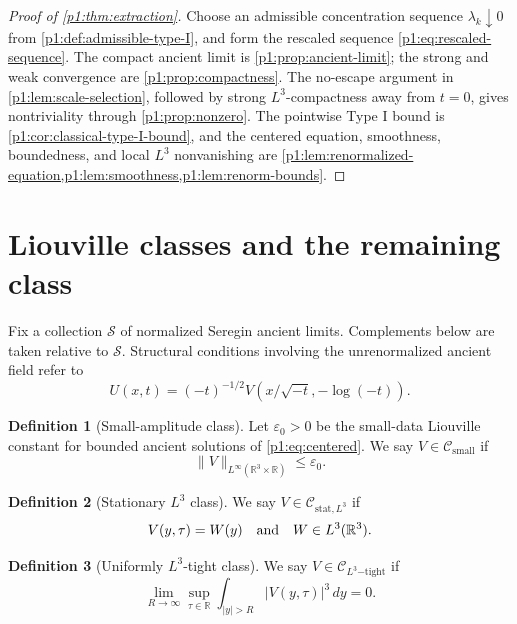 \documentclass[11pt]{amsart}
\theoremstyle{plain}
\theoremstyle{definition}
\newtheorem{definition}[definition]{Definition}
\theoremstyle{remark}
\numberwithin{equation}{section}
\newcommand{\R}{\mathbb R}
\newcommand{\calS}{\mathcal S}
\newcommand{\calC}{\mathcal C}
\begin{document}
\begin{proof}[Proof of \cref{p1:thm:extraction}]
Choose an admissible concentration sequence
\(\lambda_k\downarrow0\) from \cref{p1:def:admissible-type-I}, and form the
rescaled sequence \eqref{p1:eq:rescaled-sequence}.  The compact ancient limit is
\cref{p1:prop:ancient-limit}; the strong and weak convergence are
\cref{p1:prop:compactness}.  The no-escape argument in
\cref{p1:lem:scale-selection}, followed by strong \(L^3\)-compactness away from
\(t=0\), gives nontriviality through \cref{p1:prop:nonzero}.  The pointwise
Type I bound is \cref{p1:cor:classical-type-I-bound}, and the centered equation,
smoothness, boundedness, and local \(L^3\) nonvanishing are
\cref{p1:lem:renormalized-equation,p1:lem:smoothness,p1:lem:renorm-bounds}.
\end{proof}

\section{Liouville classes and the remaining class}\label{p1:sec:classes}

Fix a collection \(\calS\) of normalized Seregin ancient limits.  Complements
below are taken relative to \(\calS\).  Structural conditions involving the
unrenormalized ancient field refer to
\[
   U(x,t)=(-t)^{-1/2}V(x/\sqrt{-t},-\log(-t)).
\]

\begin{definition}[Small-amplitude class]\label{p1:def:small-class}
Let \(\varepsilon_0>0\) be the small-data Liouville constant for bounded
ancient solutions of \eqref{p1:eq:centered}.  We say
\(V\in\calC_{\mathrm{small}}\) if
\[
   \|V\|_{L^\infty(\R^3\times\R)}\le \varepsilon_0.
\]
\end{definition}

\begin{definition}[Stationary \(L^3\) class]\label{p1:def:stationary-class}
We say \(V\in\calC_{\mathrm{stat},L^3}\) if
\[
   V(y,\tau)=W(y)
   \quad\hbox{and}\quad
   W\in L^3(\R^3).
\]
\end{definition}

\begin{definition}[Uniformly \(L^3\)-tight class]\label{p1:def:tight-class}
We say \(V\in\calC_{L^3\mathrm{-tight}}\) if
\begin{equation}\label{p1:eq:L3-tightness}
   \lim_{R\to\infty}
   \sup_{\tau\in\R}\int_{|y|>R}|V(y,\tau)|^3\,dy=0 .
\end{equation}
\end{definition}
\end{document}
